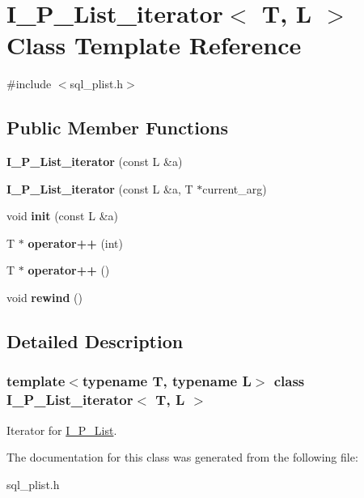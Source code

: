 \hypertarget{classI__P__List__iterator}{}\section{I\+\_\+\+P\+\_\+\+List\+\_\+iterator$<$ T, L $>$ Class Template Reference}
\label{classI__P__List__iterator}


{\ttfamily \#include $<$sql\+\_\+plist.\+h$>$}

\subsection*{Public Member Functions}
\begin{DoxyCompactItemize}
\item 
\mbox{\label{classI__P__List__iterator_aa5aacb136553ddaf1754052e57c21f4a}} 
{\bfseries I\+\_\+\+P\+\_\+\+List\+\_\+iterator} (const L \&a)
\item 
\mbox{\label{classI__P__List__iterator_ae2e3dd7d4c3062378983669cc206338e}} 
{\bfseries I\+\_\+\+P\+\_\+\+List\+\_\+iterator} (const L \&a, T $\ast$current\+\_\+arg)
\item 
\mbox{\label{classI__P__List__iterator_ac1462975525ed2e0b85908e4f8f00784}} 
void {\bfseries init} (const L \&a)
\item 
\mbox{\label{classI__P__List__iterator_afd3769ebce546350585c0dabb7ee596f}} 
T $\ast$ {\bfseries operator++} (int)
\item 
\mbox{\label{classI__P__List__iterator_aaa2325b4fc150900d177d0f22376f929}} 
T $\ast$ {\bfseries operator++} ()
\item 
\mbox{\label{classI__P__List__iterator_a046853dabf8b7902b19347f671f2868d}} 
void {\bfseries rewind} ()
\end{DoxyCompactItemize}


\subsection{Detailed Description}
\subsubsection*{template$<$typename T, typename L$>$\newline
class I\+\_\+\+P\+\_\+\+List\+\_\+iterator$<$ T, L $>$}

Iterator for \mbox{\hyperlink{classI__P__List}{I\+\_\+\+P\+\_\+\+List}}. 

The documentation for this class was generated from the following file\+:\begin{DoxyCompactItemize}
\item 
sql\+\_\+plist.\+h\end{DoxyCompactItemize}
